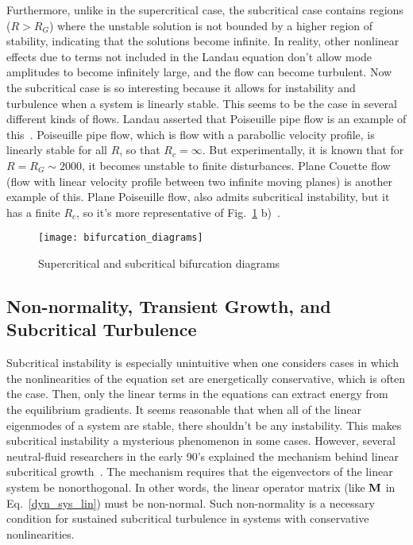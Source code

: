 Furthermore, unlike in the supercritical case, the subcritical case contains regions ($R>R_G$) where the unstable solution is not bounded by a higher
region of stability, indicating that the solutions become infinite. In reality, other nonlinear effects due to terms not included in the Landau equation don't allow mode amplitudes to become
infinitely large, and the flow can become turbulent. Now the subcritical case is so interesting because it allows for instability and turbulence when a system is linearly stable. This seems
to be the case in several different kinds of flows. Landau asserted that Poiseuille pipe flow is an example of this~\cite{landau1944}. 
Poiseuille pipe flow, which is flow with a parabollic velocity profile, is linearly stable for all $R$, so that $R_c = \infty$. 
But experimentally, it is known that for $R = R_G \sim 2000$, it becomes unstable to finite disturbances. Plane Couette flow (flow with linear velocity profile between two infinite moving planes)
is another example of this. Plane Poiseuille flow, also admits subcritical instability, but it has a finite $R_c$, so it's more representative of Fig.~\ref{bifurcation_diagrams} b)~\cite{trefethen1993}.

\begin{figure}[!ht]
\centerline{\texttt{[image: bifurcation\_diagrams]}}
\caption{Supercritical and subcritical bifurcation diagrams}
\label{bifurcation_diagrams}
\end{figure}


\subsection{Non-normality, Transient Growth, and Subcritical Turbulence}
\label{s_nonormality}

Subcritical instability is especially unintuitive when one considers cases in which the nonlinearities of the equation set are energetically conservative, which is often the case. Then, only
the linear terms in the equations can extract energy from the equilibrium gradients. It seems reasonable that when all of the linear eigenmodes of a system are stable, there shouldn't be
any instability. This makes subcritical instability a mysterious phenomenon in some cases. However, several neutral-fluid researchers in the early 90's explained the mechanism behind linear subcritical
growth~\cite{gustavsson1991,butler1992,reddy1993,reddy1993b,trefethen1993,henningson1994,henningson1996}. The mechanism requires that the eigenvectors of the linear system be nonorthogonal.
In other words, the linear operator matrix (like ${\bf M}$ in Eq.~\ref{dyn_sys_lin}) must be non-normal. 
Such non-normality is a necessary condition for sustained subcritical turbulence in systems with conservative nonlinearities.

